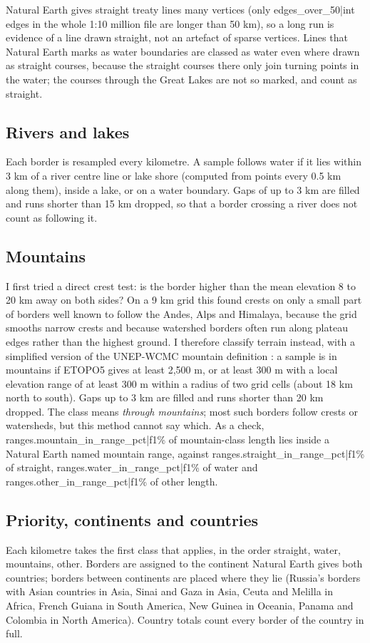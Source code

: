 \documentclass[11pt,a4paper]{article}
\begin{document}
Natural Earth gives straight treaty lines many vertices (only {{edges_over_50|int}} edges in the whole 1:10 million file are longer than 50 km), so a long run is evidence of a line drawn straight, not an artefact of sparse vertices. Lines that Natural Earth marks as water boundaries are classed as water even where drawn as straight courses, because the straight courses there only join turning points in the water; the courses through the Great Lakes are not so marked, and count as straight.

\subsection{Rivers and lakes}
Each border is resampled every kilometre. A sample follows water if it lies within 3 km of a river centre line or lake shore (computed from points every 0.5 km along them), inside a lake, or on a water boundary. Gaps of up to 3 km are filled and runs shorter than 15 km dropped, so that a border crossing a river does not count as following it.

\subsection{Mountains}
I first tried a direct crest test: is the border higher than the mean elevation 8 to 20 km away on both sides? On a 9 km grid this found crests on only a small part of borders well known to follow the Andes, Alps and Himalaya, because the grid smooths narrow crests and because watershed borders often run along plateau edges rather than the highest ground. I therefore classify terrain instead, with a simplified version of the UNEP-WCMC mountain definition \citep{kapos2000}: a sample is in mountains if ETOPO5 gives at least 2,500 m, or at least 300 m with a local elevation range of at least 300 m within a radius of two grid cells (about 18 km north to south). Gaps up to 3 km are filled and runs shorter than 20 km dropped. The class means \emph{through mountains}; most such borders follow crests or watersheds, but this method cannot say which. As a check, {{ranges.mountain_in_range_pct|f1}}\% of mountain-class length lies inside a Natural Earth named mountain range, against {{ranges.straight_in_range_pct|f1}}\% of straight, {{ranges.water_in_range_pct|f1}}\% of water and {{ranges.other_in_range_pct|f1}}\% of other length.

\subsection{Priority, continents and countries}
Each kilometre takes the first class that applies, in the order straight, water, mountains, other. Borders are assigned to the continent Natural Earth gives both countries; borders between continents are placed where they lie (Russia's borders with Asian countries in Asia, Sinai and Gaza in Asia, Ceuta and Melilla in Africa, French Guiana in South America, New Guinea in Oceania, Panama and Colombia in North America). Country totals count every border of the country in full.
\end{document}
